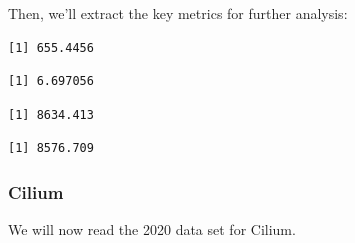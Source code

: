 Then, we'll extract the key metrics for further analysis:

\begin{Shaded}
\begin{Highlighting}[]
\SpecialCharTok{\$}
\end{Highlighting}
\end{Shaded}

\begin{verbatim}
[1] 655.4456
\end{verbatim}

\begin{Shaded}
\begin{Highlighting}[]
\SpecialCharTok{\$}
\end{Highlighting}
\end{Shaded}

\begin{verbatim}
[1] 6.697056
\end{verbatim}

\begin{Shaded}
\begin{Highlighting}[]
\SpecialCharTok{\$}
\end{Highlighting}
\end{Shaded}

\begin{verbatim}
[1] 8634.413
\end{verbatim}

\begin{Shaded}
\begin{Highlighting}[]
\SpecialCharTok{\$}
\end{Highlighting}
\end{Shaded}

\begin{verbatim}
[1] 8576.709
\end{verbatim}

\subsubsection{Cilium}

We will now read the 2020 data set for Cilium.

\begin{Shaded}
\begin{Highlighting}[]
\OtherTok{\textless{}{-}} 
\OtherTok{\textless{}{-}} \NormalTok{(}\NormalTok{,}\NormalTok{))}
\end{Highlighting}
\end{Shaded}

